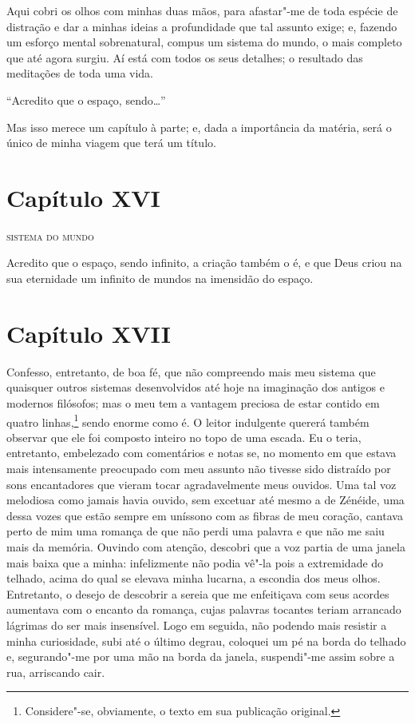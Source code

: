  Aqui cobri os olhos com minhas duas mãos, para afastar"-me de toda
espécie de distração e dar a minhas ideias a profundidade que tal
assunto exige; e, fazendo um esforço mental sobrenatural, compus um
sistema do mundo, o mais completo que até agora surgiu. Aí está com
todos os seus detalhes; o resultado das meditações de toda uma vida.

``Acredito que o espaço, sendo\ldots''

 Mas isso merece um capítulo à parte; e, dada a importância da matéria,
será o único de minha viagem que terá um título.

\section*{Capítulo XVI}

\textsc{sistema do mundo}

 Acredito que o espaço, sendo infinito, a criação também o é, e que Deus
criou na sua eternidade um infinito de mundos na imensidão do espaço.

\section*{Capítulo XVII}

 Confesso, entretanto, de boa fé, que não compreendo mais meu sistema
que quaisquer outros sistemas desenvolvidos até hoje na imaginação dos
antigos e modernos filósofos; mas o meu tem a vantagem preciosa de
estar contido em quatro linhas,\footnote{ Considere"-se, obviamente, o
texto em sua publicação original.} sendo enorme como é. O leitor
indulgente quererá também observar que ele foi composto inteiro no topo
de uma escada. Eu o teria, entretanto, embelezado com comentários e
notas se, no momento em que estava mais intensamente preocupado com meu
assunto não tivesse sido distraído por sons encantadores que vieram
tocar agradavelmente meus ouvidos. Uma tal voz melodiosa como jamais
havia ouvido, sem excetuar até mesmo a de Zénéide, uma dessa vozes que
estão sempre em uníssono com as fibras de meu coração, cantava perto de
mim uma romança de que não perdi uma palavra e que não me saiu mais da
memória. Ouvindo com atenção, descobri que a voz partia de uma janela
mais baixa que a minha: infelizmente não podia vê"-la pois a extremidade
do telhado, acima do qual se elevava minha lucarna, a escondia dos meus
olhos. Entretanto, o desejo de descobrir a sereia que me enfeitiçava
com seus acordes aumentava com o encanto da romança, cujas
palavras tocantes teriam arrancado lágrimas do ser mais insensível.
Logo em seguida, não podendo mais resistir a minha curiosidade, subi
até o último degrau, coloquei um pé na borda do telhado e, segurando"-me
por uma mão na borda da janela, suspendi"-me assim sobre a rua,
arriscando cair. 

